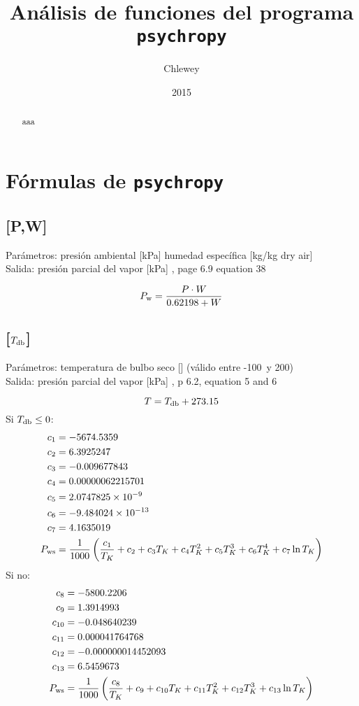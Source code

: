 \documentclass[letterpaper]{article}
\title{Análisis de funciones del programa \texttt{psychropy}}
\author{Chlewey}
\date{2015}
\newcommand*\Tdb{\ensuremath{T\sub{db}}}
\newcommand*\Pw{\ensuremath{P\sub{w}}}
\newcommand*\Pws{\ensuremath{P\sub{ws}}}
\begin{document}
\maketitle
\begin{abstract}
aaa
\end{abstract}
\tableofcontents
\section{Fórmulas de \texttt{psychropy}}

\subsection{[P,W]}
\noindent Parámetros:
presión ambiental [kPa]
humedad específica [kg/kg dry air]
\\Salida:
\vardef{\Pw}presión parcial del vapor [kPa]
\ashref, page 6.9 equation 38

\begin{equation}
\Pw=\frac{P\cdot W}{0.62198 + W}
\end{equation}


\subsection{[\Tdb]}
\noindent Parámetros:
\vardef{\Tdb}temperatura de bulbo seco [\degC] (válido entre -100\degC\ y 200\degC)
\\Salida:
\vardef{\Pws}presión parcial del vapor [kPa]
\ashref, p 6.2, equation 5 and 6

\begin{equation}
    T = \Tdb + 273.15                     %
\end{equation}    
Si $\Tdb\le 0$:
\begin{align}
  c_1 &= -5674.5359\\
  c_2 &= 6.3925247\\
  c_3 &= -0.009677843\\
  c_4 &= 0.00000062215701\\
  c_5 &= 2.0747825\times10^{-9}\\
  c_6 &= -9.484024\times10^{-13}\\
  c_7 &= 4.1635019\\
  \Pws &= \frac1{1000}\left(\frac{c_1}{T_K} + c_2 + c_3T_K + c_4T_K^2 + c_5T_K^3 + c_6T_K^4 + c_7\ln{T_K}\right)
\end{align}
Si no:
\begin{align}
  c_8 &= -5800.2206\\
  c_9 &= 1.3914993\\
  c_{10} &= -0.048640239\\
  c_{11} &= 0.000041764768\\
  c_{12} &= -0.000000014452093\\
  c_{13} &= 6.5459673\\
  \Pws &= \frac1{1000}\left(\frac{c_8}{T_K} + c_9 + c_{10}T_K + c_{11}T_K^2 + c_{12}T_K^3 + c_{13}\ln{T_K}\right)
\end{align}
\end{document}
